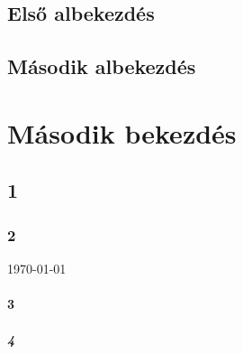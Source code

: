 \documentclass[titlepage,12pt]{article}
\begin{document}
 \subsection{Első albekezdés}
 \hulipsum[2]
  \subsection{Második albekezdés}
  \hulipsum[3]
\section{Második bekezdés}
\label{mylabel3}

\subsection{1}
\setlength{\parskip}{12pt}
\setlength{\parindent}{0pt}
\hulipsum[3] \medbreak
 \subsubsection{2}
 \label{mylabel4}

\today \smallbreak \raggedleft{\lipsum[3]} \par  \medbreak
 \paragraph{3} 
 \bigskip
 \frenchspacing \linespread{1.6}\selectfont {\blindtext[3]} \par \medbreak
 \subparagraph{4} \medbreak
 
\end{document}
